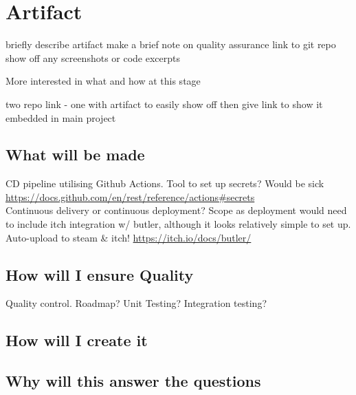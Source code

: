 \documentclass[lettersize,journal]{IEEEtran}
\begin{document}
\section{Artifact}
    briefly describe artifact
    make a brief note on quality assurance
    link to git repo
    show off any screenshots or code excerpts

    More interested in what and how at this stage

    two repo link - one with artifact to easily show off then give link to show it embedded in main project
    \subsection{What will be made}
        CD pipeline utilising Github Actions. Tool to set up secrets? Would be sick \url{https://docs.github.com/en/rest/reference/actions#secrets} \\
        Continuous delivery or continuous deployment? Scope as deployment would need to include itch integration w/ butler, although it looks relatively simple to set up.
        Auto-upload to steam \& itch! \url{https://itch.io/docs/butler/}

    \subsection{How will I ensure Quality}
        Quality control. Roadmap? Unit Testing? Integration testing?

    \subsection{How will I create it}

    \subsection{Why will this answer the questions}



\end{document}

